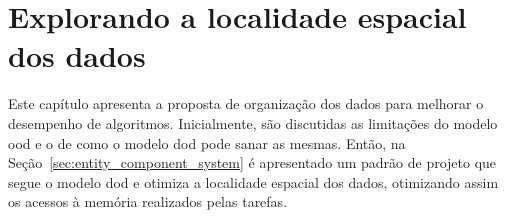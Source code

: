 \chapter{Explorando a localidade espacial dos dados}
\label{cap:tecnica_proposta}

Este capítulo apresenta a proposta de organização dos dados para melhorar o desempenho de algoritmos.
Inicialmente, são discutidas as limitações do modelo \ac{ood} e o de como o modelo \ac{dod} pode sanar as mesmas.
Então, na Seção~\ref{sec:entity_component_system} é apresentado um padrão de projeto que segue o modelo \ac{dod} e otimiza a localidade espacial dos dados, otimizando assim os acessos à memória realizados pelas tarefas.




